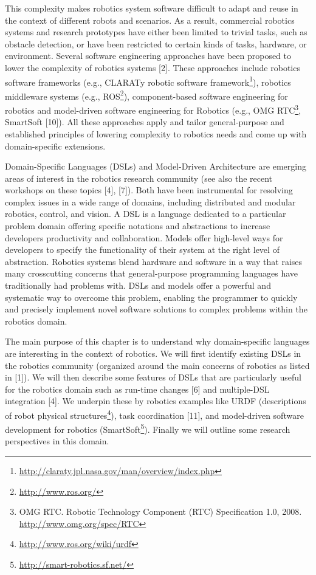 \documentclass[book]{apa}
\begin{document}
This complexity makes robotics system software difficult to adapt and reuse in the context of different robots and scenarios. As a result, commercial robotics systems and research prototypes have either been limited to trivial tasks, such as obstacle detection, or have been restricted to certain kinds of tasks, hardware, or environment. Several software engineering approaches have been proposed to lower the complexity of robotics systems [2]. These approaches include robotics software frameworks (e.g., CLARATy robotic software framework\footnote{\url{http://claraty.jpl.nasa.gov/man/overview/index.php}}), robotics middleware systems (e.g., ROS\footnote{\url{http://www.ros.org/}}), component-based software engineering for robotics\cite{Brugali:2007oq} and model-driven software engineering for Robotics (e.g., OMG RTC\footnote{OMG RTC. Robotic Technology Component (RTC) Specification 1.0, 2008. \url{http://www.omg.org/spec/RTC}}, SmartSoft [10]). All these approaches apply and tailor general-purpose and established principles of lowering complexity to robotics needs and come up with domain-specific extensions.

Domain-Specific Languages (DSLs)\cite{Deursen:2000uq} and Model-Driven Architecture are emerging areas of interest in the robotics research community (see also the recent workshops on these topics [4], [7]). Both have been instrumental for resolving complex issues in a wide range of domains, including distributed and modular robotics, control, and vision. A DSL is a language dedicated to a particular problem domain offering specific notations and abstractions to increase developers productivity and collaboration. Models offer high-level ways for developers to specify the functionality of their system at the right level of abstraction. Robotics systems blend hardware and software in a way that raises many crosscutting concerns that general-purpose programming languages have traditionally had problems with. DSLs and models offer a powerful and systematic way to overcome this problem, enabling the programmer to quickly and precisely implement novel software solutions to complex problems within the robotics domain.

The main purpose of this chapter is to understand why domain-specific languages are interesting in the context of robotics. We will first identify existing DSLs in the robotics community (organized around the main concerns of robotics as listed in [1]). We will then describe some features of DSLs that are particularly useful for the robotics domain such as run-time changes [6] and multiple-DSL integration [4]. We underpin these by robotics examples like URDF (descriptions of robot physical structures\footnote{\url{http://www.ros.org/wiki/urdf}}), task coordination [11], and model-driven software development for robotics (SmartSoft\footnote{\url{http://smart-robotics.sf.net/}}). Finally we will outline some research perspectives in this domain.
\end{document}

